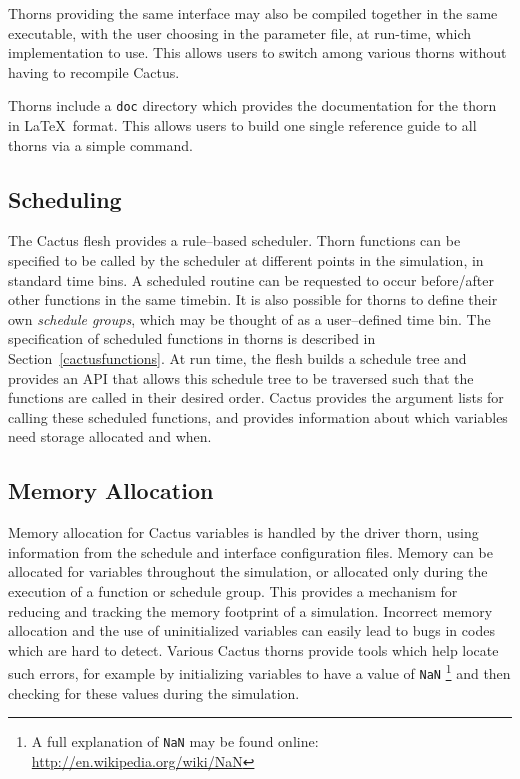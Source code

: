 \documentclass[conference]{IEEEtran}
\begin{document}
Thorns providing the same interface 
 may also be compiled together in the same executable, with the user choosing in the parameter file, at run-time, which implementation to use.
This allows users to switch
among various thorns without having to recompile Cactus. 

Thorns include a \texttt{doc} directory which provides the documentation for the thorn in 
\LaTeX\ format. This allows users to build one single reference guide
to all thorns via a simple command.


\subsection{Scheduling}

The Cactus flesh provides a rule--based scheduler. Thorn functions can be specified to be called
by the scheduler at different points in the simulation, in standard time bins.  A scheduled routine can be requested to occur before/after other functions in the same timebin.
It is also possible for thorns to define their own \emph{schedule groups}, which may be thought of as a user--defined time bin.
The 
specification of scheduled functions in thorns is described in Section~\ref{cactusfunctions}. 
At run time, the flesh builds a schedule tree and provides an API that allows this schedule tree to be traversed such that the functions are called in their desired order. Cactus provides the argument lists for calling these scheduled functions, and provides information about which variables need storage allocated and when.


\subsection{Memory Allocation}

Memory allocation for Cactus variables is handled by the driver thorn, using information from the schedule and interface 
configuration files. Memory can be allocated 
for variables throughout the simulation, or allocated only during the execution of a function or schedule group. This provides a mechanism for reducing and tracking the memory
footprint of a simulation.
Incorrect memory allocation and the use of uninitialized variables can easily lead to bugs in codes which are hard to detect.
Various Cactus thorns provide tools which help locate such errors, for 
example by initializing variables to have a value of {\tt NaN}
\footnote{A full explanation of {\tt NaN} may be found online: \url{http://en.wikipedia.org/wiki/NaN}}
and then checking for these values during the simulation.  
\end{document}
